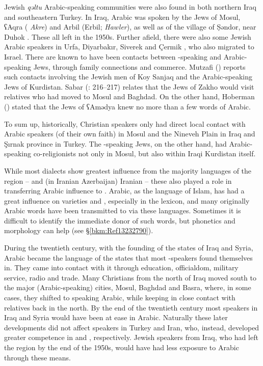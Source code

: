 \documentclass[output=paper]{langsci/langscibook}
\begin{document}
Jewish \textit{qəltu} Arabic-speaking communities were also found in both northern Iraq and southeastern Turkey. In Iraq, Arabic was spoken by the {Jews} of Mosul, ʕAqra ( \textit{Akre}) and Arbil (Erbil;  \textit{Hawler}), as well as of the village of Ṣəndor, near Duhok \citep[9]{Hoberman1989}. These all left in the 1950s. Further afield, there were also some Jewish Arabic speakers in Urfa, Diyarbakır, Siverek and Çermik \citep[4]{Jastrow1978}, who also migrated to Israel. There are known to have been contacts between -speaking and Arabic-speaking {Jews}, through family connections and commerce. Mutzafi (\citeyear[6]{Mutzafi2004}) reports such contacts involving the Jewish men of Koy Sanjaq and the Arabic-speaking {Jews} of Kurdistan. Sabar (\citeyear{Sabar1978}: 216–217) relates that the {Jews} of Zakho would visit relatives who had moved to Mosul and Baghdad. On the other hand, Hoberman (\citeyear[9]{Hoberman1989}) stated that the {Jews} of ʕAmədya knew no more than a few words of  Arabic.

To sum up, historically, Christian  speakers only had direct local contact with Arabic speakers (of their own faith) in Mosul and the Nineveh Plain in Iraq and Şırnak province in Turkey. The -speaking {Jews}, on the other hand, had Arabic-speaking co-religionists not only in Mosul, but also within Iraqi Kurdistan itself.

While most  dialects show greatest influence from the majority languages of the region –  and (in Iranian Azerbaijan) Iranian  – these also played a role in transferring Arabic influence to . Arabic, as the language of Islam, has had a great influence on  varieties and , especially in the lexicon, and many originally Arabic words have been transmitted to  via these languages. Sometimes it is difficult to identify the immediate donor of such words, but phonetics and morphology can help (see §\ref{bkm:Ref13232790}).

During the twentieth century, with the founding of the states of Iraq and Syria, Arabic became the language of the states that most -speakers found themselves in. They came into contact with it through education, officialdom, military service, radio and trade. Many {Christians} from the north of Iraq moved south to the major (Arabic-speaking) cities, Mosul, Baghdad and Basra, where, in some cases, they shifted to speaking Arabic, while keeping in close contact with relatives back in the north. By the end of the twentieth century most  speakers in Iraq and Syria would have been at ease in Arabic. Naturally these later developments did not affect speakers in Turkey and Iran, who, instead, developed greater competence in  and , respectively. Jewish speakers from Iraq, who had left the region by the end of the 1950s, would have had less exposure to Arabic through these means.
\end{document}
